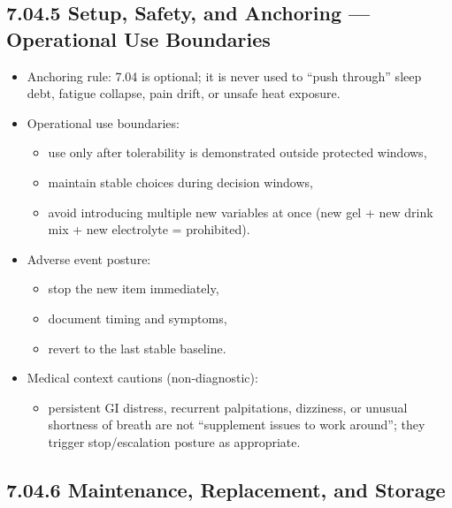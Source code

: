 \documentclass[10pt]{article}
\begin{document}
\subsection*{7.04.5 Setup, Safety, and Anchoring — Operational Use Boundaries}
{}

\begin{itemize}
\item Anchoring rule: 7.04 is optional; it is never used to “push through” sleep debt, fatigue collapse, pain drift, or unsafe heat exposure.
\item Operational use boundaries:
  \begin{itemize}
  \item use only after tolerability is demonstrated outside protected windows,
  \item maintain stable choices during decision windows,
  \item avoid introducing multiple new variables at once (new gel + new drink mix + new electrolyte = prohibited).
  \end{itemize}
\item Adverse event posture:
  \begin{itemize}
  \item stop the new item immediately,
  \item document timing and symptoms,
  \item revert to the last stable baseline.
  \end{itemize}
\item Medical context cautions (non-diagnostic):
  \begin{itemize}
  \item persistent GI distress, recurrent palpitations, dizziness, or unusual shortness of breath are not “supplement issues to work around”; they trigger stop/escalation posture as appropriate.
  \end{itemize}
\end{itemize}

\subsection*{7.04.6 Maintenance, Replacement, and Storage}
{}
\end{document}
